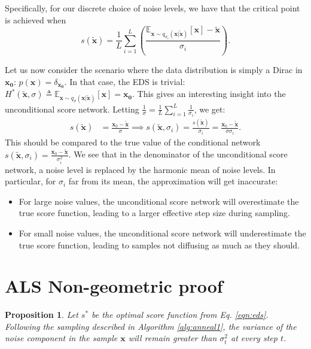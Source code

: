 \documentclass{article} \usepackage{iclr2021_conference_notitle,times}
\theoremstyle{definition}
\theoremstyle{definition}
\newtheorem{proposition}{Proposition}
\begin{document}
Specifically, for our discrete choice of noise levels, we have that the critical point is achieved when $$ s(\boldsymbol{\tilde{x}}) = \frac{1}{L} \sum_{i=1} ^L \left(  \frac{\mathbb{E}_{\boldsymbol{x} \sim q_{\sigma_i}(\boldsymbol{x} | \boldsymbol{\tilde{x}})}[\boldsymbol{x}] - \boldsymbol{\tilde{x}}}{\sigma_i} \right). $$

Let us now consider the scenario where the data distribution is simply a Dirac in $\boldsymbol{x_0}$: $p(\boldsymbol{x}) = \delta_{\boldsymbol{x_0}}$. In that case, the EDS is trivial: $H^*(\boldsymbol{\tilde{x}},\sigma) \triangleq \mathbb{E}_{\boldsymbol{x} \sim q_\sigma(\boldsymbol{x} | \boldsymbol{\tilde{x}})}[\boldsymbol{x}] = \boldsymbol{x_0}$. This gives an interesting insight into the unconditional score network. Letting $\frac{1}{\sigma} = \frac{1}{L} \sum_{i=1}^L \frac{1}{\sigma_i}$, we get:
\begin{align*}
    s(\boldsymbol{\tilde{x}}) &= \frac{\boldsymbol{x}_0 - \boldsymbol{\tilde{x}}}{\sigma} \implies s(\boldsymbol{\tilde{x}}, \sigma_i) = \frac{s(\boldsymbol{\tilde{x}})}{\sigma_i} = \frac{\boldsymbol{x}_0 - \boldsymbol{\tilde{x}}}{\sigma \sigma_i}.
\end{align*}
This should be compared to the true value of the conditional network $s(\boldsymbol{\tilde{x}}, \sigma_i) = \frac{\boldsymbol{x}_0 - \boldsymbol{\tilde{x}}}{\sigma_i^2}$. We see that in the denominator of the unconditional score network, a noise level is replaced by the harmonic mean of noise levels. In particular, for $\sigma_i$ far from its mean, the approximation will get inaccurate:
\begin{itemize}
    \item For large noise values, the unconditional score network will overestimate the true score function, leading to a larger effective step size during sampling.
    \item For small noise values, the unconditional score network will underestimate the true score function, leading to samples not diffusing as much as they should.
\end{itemize}


\section{ALS Non-geometric proof}\label{app:als_bad_proof}

\addtocounter{proposition}{-3}
\begin{proposition}
\em 
Let $s^*$ be the optimal score function from Eq. \ref{eqn:eds}. Following the sampling described in Algorithm \ref{alg:anneal1}, the variance of the noise component in the sample $\boldsymbol{x}$ will remain greater than $\sigma_t^2$ at every step $t$.\em 
\end{proposition}
\end{document}
